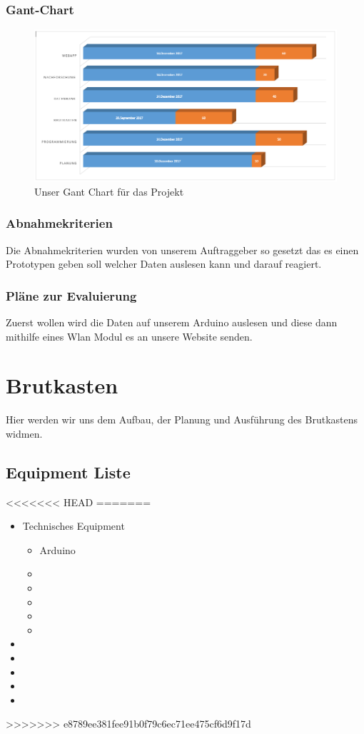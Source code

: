 \subsection{Gant-Chart}
  
\begin{figure} 
\hspace*{-2cm}
\includegraphics[width=530pt]{figures/Gant}
\caption{Unser Gant Chart für das Projekt} 
\end{figure}
\subsection{Abnahmekriterien}
Die Abnahmekriterien wurden von unserem Auftraggeber so gesetzt das es einen Prototypen geben soll welcher Daten auslesen kann und darauf reagiert.
\subsection{Pläne zur Evaluierung}
Zuerst wollen wird die Daten auf unserem Arduino auslesen und diese dann mithilfe eines Wlan Modul es an unsere Website senden.


\chapter{Brutkasten}
 Hier werden wir uns dem Aufbau, der Planung und  Ausführung des Brutkastens widmen. 
\section{Equipment Liste}
<<<<<<< HEAD
=======
\begin{itemize}
	\item Technisches Equipment
	\begin{itemize}
		\item Arduino
		\item 
		\item 
		\item 
		\item 
		\item 
	\end{itemize}
	\item
	\item
	\item
	\item
	\item
\end{itemize}
>>>>>>> e8789ee381fee91b0f79c6ec71ee475cf6d9f17d

